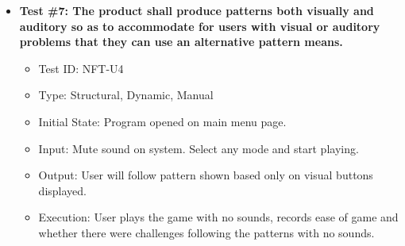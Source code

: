 \documentclass[12pt, titlepage]{article}
\begin{document}
\begin{itemize}
\item \textbf{Test \#7: The product shall produce patterns both visually and auditory so as to accommodate for users with visual or auditory problems that they can use an alternative pattern means.}
\begin{itemize}
\item Test ID: NFT-U4
\item Type: Structural, Dynamic, Manual				
\item Initial State: Program opened on main menu page.		
\item Input: Mute sound on system. Select any mode and start playing.
\item Output: User will follow pattern shown based only on visual buttons displayed.
\item Execution: User plays the game with no sounds, records ease of game and whether there were challenges following the patterns with no sounds.
\end{itemize}
\end{itemize}
\end{document}
